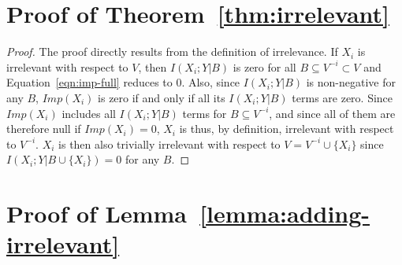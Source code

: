 \documentclass{article}
\begin{document}

\section{Proof of Theorem~\ref{thm:irrelevant}}
\label{app:thm:irrelevant}

\begin{proof}
The proof directly results from the definition of irrelevance. If $X_i$ is
irrelevant with respect to $V$, then $I(X_i;Y|B)$ is zero for all $B \subseteq
V^{-i} \subset V$ and Equation~\ref{eqn:imp-full} reduces to $0$. Also, since
$I(X_i;Y|B)$ is non-negative for any $B$, $Imp(X_i)$ is zero if and only if all
its $I(X_i;Y|B)$ terms are zero. Since $Imp(X_i)$ includes all $I(X_i;Y|B)$
terms for $B \subseteq V^{-i}$, and since all of them are therefore null if
$Imp(X_i)=0$,  $X_i$ is thus, by definition, irrelevant with respect to
$V^{-i}$. $X_i$ is then also trivially irrelevant with respect to $V=V^{-i} \cup
\{X_i\}$ since $I(X_i;Y|B\cup\{X_i\})=0$ for any $B$.
\end{proof}



\section{Proof of Lemma~\ref{lemma:adding-irrelevant}}
\label{app:lemma:adding-irrelevant}
\end{document}
